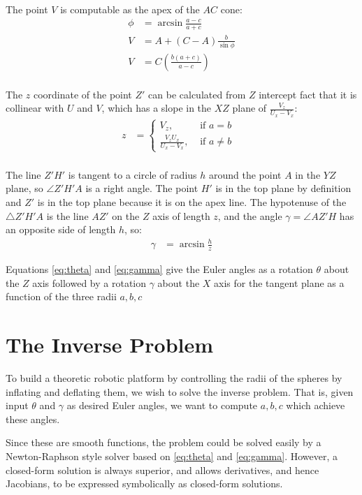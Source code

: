 \documentclass{article}
\begin{document}
The point $V$ is computable as the apex of the $AC$ cone:
\begin{align}
  \phi &= \arcsin{\frac{a - c}{a + c}} \\
  V &= A + (C-A) \frac{b}{\sin{\phi}} \\
  V &= C (\frac{b(a+c)}{a-c}) \\
\end{align}

The $z$ coordinate of the point $Z'$ can be calculated from
$Z$ intercept
fact that it is collinear with $U$ and $V$, which has a slope
in the $XZ$ plane of $\frac{V_z}{U_x-V_x}$:
\begin{align}
  z&= \begin{cases}
    V_z, & \text{ if $a = b$ } \\
    \frac{V_z U_x}{U_x - V_x}, & \text{ if  $a \neq b$}
  \end{cases}
  \label{eq:zprime} \\
\end{align}

The line $Z'H'$ is tangent to a circle of radius $h$ around the point $A$
in the $YZ$ plane, so $\angle Z'H'A$ is a right angle.
The point $H'$ is in the top plane by definition and $Z'$ is in the top plane
because it is on the apex line.
The hypotenuse of the $\triangle Z'H'A$ is the line $AZ'$ on the $Z$ axis of
length $z$, and the angle $\gamma = \angle AZ'H$ has an opposite side of length $h$,
so:
\begin{align}
  \gamma &= \arcsin{\frac{h}{z}} \label{eq:gamma}
\end{align}

Equations \ref{eq:theta} and \ref{eq:gamma} give the Euler angles
as a rotation $\theta$ about the $Z$ axis followed by a rotation $\gamma$ about the $X$ axis
for the tangent plane as a function of the three radii $a,b,c$

\section{The Inverse Problem}

To build a theoretic robotic platform by controlling the radii of the
spheres by inflating and deflating them, we wish to solve the inverse
problem. That is, given input $\theta$ and $\gamma$ as desired Euler
angles, we want to compute $a,b,c$ which achieve these angles.

Since these are smooth functions, the problem could be solved
easily by a Newton-Raphson style solver based on \ref{eq:theta} and \ref{eq:gamma}.
However, a closed-form solution is always superior, and allows derivatives,
and hence Jacobians, to be expressed symbolically as closed-form solutions.
\end{document}
